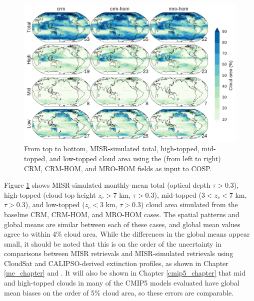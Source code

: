 \begin{figure}
\centering
\includegraphics[width=\columnwidth]{graphics/cldmisr_mro-hom.pdf}
\caption{From top to bottom, MISR-simulated total, high-topped, mid-topped, and low-topped cloud area using the (from left to right) CRM, CRM-HOM, and MRO-HOM fields as input to COSP.}
\label{sg_cldmisr_maps}
\end{figure}

Figure \ref{sg_cldmisr_maps} shows MISR-simulated monthly-mean total (optical depth $\tau > 0.3$), high-topped (cloud top height $z_c > 7$ km, $\tau > 0.3$), mid-topped ($3 < z_c < 7$ km, $\tau > 0.3$), and low-topped ($z_c < 3$ km, $\tau > 0.3$) cloud area simulated from the baseline CRM, CRM-HOM, and MRO-HOM cases. The spatial patterns and global means are similar between each of these cases, and global mean values agree to within 4\% cloud area. While the differences in the global means appear small, it should be noted that this is on the order of the uncertainty in comparisons between MISR retrievals and MISR-simulated retrievals using CloudSat and CALIPSO-derived extinction profiles, as shown in Chapter \ref{me_chapter} and \cite{hillman_et_al_2016}. It will also be shown in Chapter \ref{cmip5_chapter} that mid and high-topped clouds in many of the CMIP5 models evaluated have global mean biases on the order of 5\% cloud area, so these errors are comparable.

